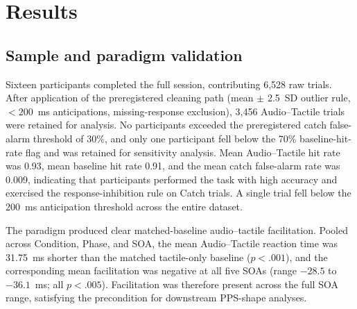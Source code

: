 
\section{Results}


\subsection{Sample and paradigm validation}

Sixteen participants completed the full session, contributing 6{,}528 raw trials. After application of the preregistered cleaning path (mean $\pm$ 2.5~SD outlier rule, $<200$~ms anticipations, missing-response exclusion), 3{,}456 Audio--Tactile trials were retained for analysis. No participants exceeded the preregistered catch false-alarm threshold of 30\%, and only one participant fell below the 70\% baseline-hit-rate flag and was retained for sensitivity analysis. Mean Audio--Tactile hit rate was 0.93, mean baseline hit rate 0.91, and the mean catch false-alarm rate was 0.009, indicating that participants performed the task with high accuracy and exercised the response-inhibition rule on Catch trials. A single trial fell below the 200~ms anticipation threshold across the entire dataset.

The paradigm produced clear matched-baseline audio--tactile facilitation. Pooled across Condition, Phase, and SOA, the mean Audio--Tactile reaction time was 31.75~ms shorter than the matched tactile-only baseline ($p < .001$), and the corresponding mean facilitation was negative at all five SOAs (range $-28.5$ to $-36.1$~ms; all $p < .005$). Facilitation was therefore present across the full SOA range, satisfying the precondition for downstream PPS-shape analyses.


